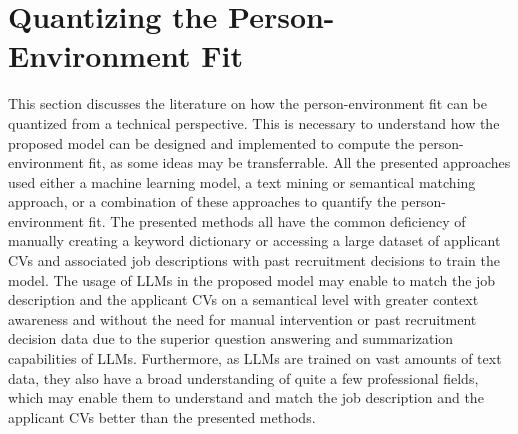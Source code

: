 \documentclass[draft,final]{thesisclass} %
\begin{document}
\section{Quantizing the Person-Environment Fit}
This section discusses the literature on how the person-environment fit can be quantized from a technical perspective.
This is necessary to understand how the proposed model can be designed and implemented to compute the person-environment fit, as some ideas may be transferrable.
All the presented approaches used either a machine learning model, a text mining or semantical matching approach, or a combination of these approaches to quantify the person-environment fit.
The presented methods all have the common deficiency of manually creating a keyword dictionary or accessing a large dataset of applicant \acs{CV}s and associated job descriptions with past recruitment decisions to train the model.
The usage of \gls{LLM}s in the proposed model may enable to match the job description and the applicant \acs{CV}s on a semantical level with greater context awareness and without the need for manual intervention or past recruitment decision data due to the superior question answering and summarization capabilities of \gls{LLM}s.
Furthermore, as \gls{LLM}s are trained on vast amounts of text data, they also have a broad understanding of quite a few professional fields, which may enable them to understand and match the job description and the applicant \acs{CV}s better than the presented methods.
\end{document}

